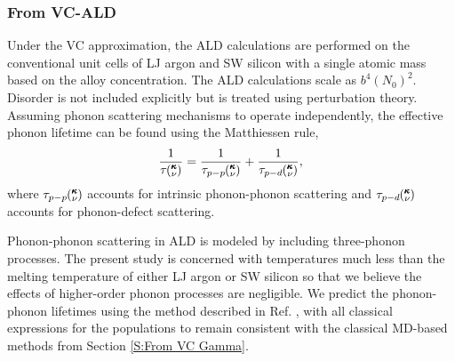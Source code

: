\clearpage

\subsubsection{\label{S:From VC-ALD}From VC-ALD}

Under the VC approximation, the 
ALD calculations\cite{turney_predicting_2009-1} are performed on the 
conventional unit cells of LJ argon and SW silicon with a single  
atomic mass based on the alloy concentration. The ALD calculations scale 
as $b^4(N_{0})^2$.\cite{turney_predicting_2009} Disorder is not included 
explicitly but is treated using perturbation theory. 
Assuming phonon scattering mechanisms 
to operate independently, the 
effective phonon lifetime can be found using the Matthiessen rule,
\cite{ziman_electrons_2001} 
\begin{equation}\label{EQ:Matthiessen}
\frac{1}{\tau\kv} = \frac{1}{\tau_{p-p}\kv} + \frac{1}{\tau_{p-d}\kv},
\end{equation}
where $\tau_{p-p}\mspace{-4.0mu}\left(\mspace{-8.0mu} \begin{smallmatrix}&\pmb{\kappa} \\&\nu \end{smallmatrix}\mspace{-3.0mu}\right)$ accounts for intrinsic phonon-phonon scattering 
and $\tau_{p-d}\mspace{-4.0mu}\left(\mspace{-8.0mu} \begin{smallmatrix}&\pmb{\kappa} \\&\nu \end{smallmatrix}\mspace{-3.0mu}\right)$ accounts for phonon-defect scattering.

Phonon-phonon scattering in ALD is modeled by including three-phonon 
processes.\cite{turney_predicting_2009-1,garg_role_2011,tian_phonon_2012} 
The present study is concerned with temperatures much less than the 
melting temperature of either LJ argon
\cite{mcgaughey_phonon_2004} or 
SW silicon\cite{stillinger_computer_1985} so that we believe the effects 
of higher-order phonon processes are 
negligible.\cite{ecsedy_thermal_1977,turney_predicting_2009-1} 
We predict the phonon-phonon lifetimes using the method 
described in Ref. , 
with all classical expressions for the populations to remain 
consistent with the classical MD-based methods from 
Section \ref{S:From VC Gamma}. 

